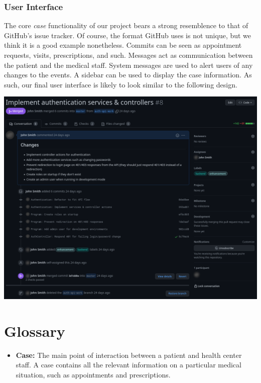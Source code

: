\documentclass[a4paper, 12pt, titlepage]{article}
\begin{document}
  \pagebreak
  \subsubsection{User Interface}

  The core \textit{case} functionality of our project bears a strong resemblence to that of GitHub's issue tracker.
  Of course, the format GitHub uses is not unique, but we think it is a good example nonetheless.
  Commits can be seen as appointment requests, visits, prescriptions, and such.
  Messages act as communication between the patient and the medical staff.
  System messages are used to alert users of any changes to the events.
  A sidebar can be used to display the case information.
  As such, our final user interface is likely to look similar to the following design.

  \includegraphics[width=\linewidth]{github_ui}

  \section{Glossary}

  \begin{itemize}
    \item \textbf{Case:} The main point of interaction between a patient and health center staff.
      A case contains all the relevant information on a particular medical situation,
      such as appointments and prescriptions.

  \end{itemize}
\end{document}
